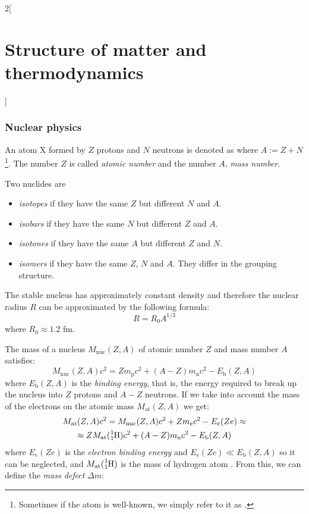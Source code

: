 \documentclass[../../../main_physics.tex]{subfiles}
\begin{document}
\begin{multicols}{2}[\section{Structure of matter and thermodynamics}]
  \subsubsection{Nuclear physics}
  \begin{definition}[Atom]
    An atom X formed by $Z$ protons and $N$ neutrons is denoted as  where $A:=Z+N$\footnote{Sometimes if the atom  is well-known, we simply refer to it as .}. The number $Z$ is called \emph{atomic number} and the number $A$, \emph{mass number}.
  \end{definition}
  \begin{definition}
    Two nuclides are
    \begin{itemize}
      \item \emph{isotopes} if they have the same $Z$ but different $N$ and $A$.
      \item \emph{isobars} if they have the same $N$ but different $Z$ and $A$.
      \item \emph{isotones} if they have the same $A$ but different $Z$ and $N$.
      \item \emph{isomers} if they have the same $Z$, $N$ and $A$. They differ in the grouping structure.
    \end{itemize}
  \end{definition}
  \begin{proposition}
    The stable nucleus has approximately constant density and therefore the nuclear radius $R$ can be approximated by the following formula:
    $$R=R_0A^{1/3}$$ where $R_0\approx1.2\text{ fm}$.
  \end{proposition}
  \begin{proposition}
    The mass of a nucleus $M_\text{nuc}(Z,A)$ of atomic number $Z$ and mass number $A$ satisfies:
    $$M_\text{nuc}(Z,A)c^2=Zm_\text{p}c^2+(A-Z)m_\text{n}c^2-E_\text{b}(Z,A)$$ where $E_\text{b}(Z,A)$ is the \emph{binding energy}, that is, the energy required to break up the nucleus into $Z$ protons and $A-Z$ neutrons. If we take into account the mass of the electrons on the atomic mass $M_\text{at}(Z,A)$ we get:
    \begin{multline*}
      M_\text{at}(Z,A)c^2=M_\text{nuc}(Z,A)c^2+Zm_ec^2-E_e(Ze)\approx\\\approx ZM_\text{at}(\ce{^1_1H})c^2+(A-Z)m_\text{n}c^2-E_\text{b}(Z,A)
    \end{multline*}
    where $E_e(Ze)$ is the \emph{electron binding energy} and $E_e(Ze)\ll E_\text{b}(Z,A)$ so it can be neglected, and $M_\text{at}(\ce{^1_1H})$ is the mass of hydrogen atom . From this, we can define the \emph{mass defect} $\Delta m$:

\end{proposition}
\end{multicols}
\end{document}
